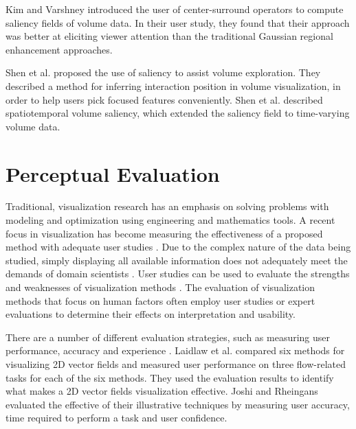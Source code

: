 Kim and Varshney \cite{kim_saliency-guided_2006} introduced the user of center-surround operators to compute saliency fields of volume data. In their user study, they found that their approach was better at eliciting viewer attention than the traditional Gaussian regional enhancement approaches.

Shen et al. \cite{shen_save:_2014} proposed the use of saliency to assist volume exploration. They described a method for inferring interaction position in volume visualization, in order to help users pick focused features conveniently.
Shen et al. \cite{shen_spatiotemporal_2015} described spatiotemporal volume saliency, which extended the saliency field \cite{kim_saliency-guided_2006} to time-varying volume data.





\section{Perceptual Evaluation}
Traditional, visualization research has an emphasis on solving problems with modeling and optimization using engineering and mathematics tools.
A recent focus in visualization has become measuring the effectiveness of a proposed method with adequate user studies \cite{giesen_conjoint_2007}.
Due to the complex nature of the data being studied, simply displaying all available information does not adequately meet the demands of domain scientists \cite{anderson_evaluating_2012}.
User studies can be used to evaluate the strengths and weaknesses of visualization methods \cite{christopher_thoughts_2003}.
The evaluation of visualization methods that focus on human factors often employ user studies or expert evaluations to determine their effects on interpretation and usability.

There are a number of different evaluation strategies, such as measuring user performance, accuracy and experience \cite{redmond_influencing_2010}. Laidlaw et al. \cite{laidlaw_quantitative_2001} compared six methods for visualizing 2D vector fields and measured user performance on three flow-related tasks for each of the six methods. They used the evaluation results to identify what makes a 2D vector fields visualization effective.
Joshi and Rheingans \cite{joshi_evaluation_2008} evaluated the effective of their illustrative techniques by measuring user accuracy, time required to perform a task and user confidence.

